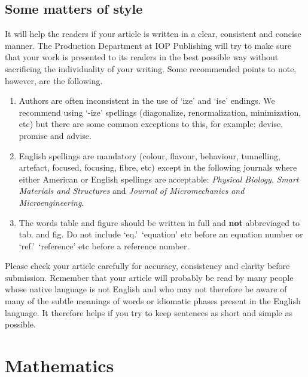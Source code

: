 \documentclass[12pt]{iopart}
\begin{document}
\subsection{Some matters of style}
It will help the readers if your article is written in a clear,
consistent and concise manner. The Production Department at IOP
Publishing will try to make sure that your work is presented to its
readers in the best possible way without sacrificing the individuality of
your writing. Some recommended 
points to note, however, are the following.
\begin{enumerate}
\item Authors are often inconsistent in the use of `ize' and `ise' endings.
We recommend using `-ize' spellings (diagonalize, 
renormalization, minimization, etc) but there are some common 
exceptions to this, for example: devise, 
promise and advise.

\item English spellings are mandatory (colour, flavour, behaviour, tunnelling, artefact, focused, focusing, fibre, etc) except in the following journals where either American or English spellings are acceptable: {\it Physical Biology}, {\it Smart Materials and Structures} and {\it Journal of Micromechanics and Microengineering}. 

\item The words table and figure should be written 
in full and {\bf not} abbreviaged to tab. and fig. Do not include `eq.'\, `equation' etc before an equation number or `ref.'\, `reference' etc before a reference number.
\end{enumerate}

Please check your article carefully for accuracy, consistency and clarity before
submission. Remember that your article will probably be read by many
people whose native language is not English and who may not therefore 
be aware of many of the subtle meanings of words or idiomatic phases
present in the English language. It therefore helps if you try to keep
sentences as short and simple as possible.

\section{Mathematics}
\end{document}
